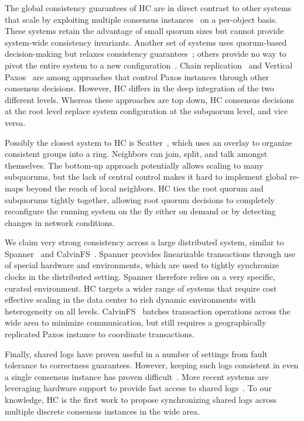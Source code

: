 The global consistency guarantees of HC are in direct contrast to other systems that scale by exploiting multiple consensus instances~\cite{bigtable,mdcc,megastore} on a per-object basis.
These systems retain the advantage of small quorum sizes but cannot provide system-wide consistency invariants.
Another set of systems uses quorum-based decision-making but relaxes consistency guarantees~\cite{dynamo,pnuts,cops}; others provide no way to pivot the entire system to a new configuration~\cite{scatter}.
Chain replication~\cite{van2004chain} and Vertical Paxos~\cite{vertical_paxos} are among approaches that control Paxos instances through other consensus decisions.
However, HC differs in the deep integration of the two different levels.
Whereas these approaches are top down, HC consensus decisions at the root level replace system configuration at the subquorum level, and vice versa.

Possibly the closest system to HC is Scatter~\cite{scatter}, which uses an overlay to organize consistent groups into a ring.
Neighbors can join, split, and talk amongst themselves. The bottom-up approach potentially allows scaling to many subquorums, but the lack of central control makes it hard to implement global re-maps beyond the reach of local neighbors.
HC ties the root quorum and subquorums tightly together, allowing root quorum decisions to completely reconfigure the running system on the fly either on demand or by detecting changes in network conditions.

We claim very strong consistency across a large distributed system, similar to Spanner~\cite{spanner} and CalvinFS~\cite{calvindb,calvinfs}.
Spanner provides linearizable  transactions through use of special hardware and environments, which are used to tightly synchronize clocks in the distributed setting.
Spanner therefore relies on a very specific, curated environment.
HC targets a wider range of systems that require cost effective scaling in the data center to rich dynamic environments with heterogeneity on all levels.
CalvinFS~\cite{calvindb,calvinfs} batches transaction operations across the wide area to minimize communication, but still requires a geographically replicated Paxos instance to coordinate transactions.

Finally, shared logs have proven useful in a number of settings from fault tolerance to correctness guarantees.
However, keeping such logs consistent in even a single consensus instance has proven difficult~\cite{chubby,gfs,zookeeper}.
More recent systems are leveraging hardware support to provide fast access to shared logs~\cite{vcorfu,tango,hyder-a,fawn}.
To our knowledge, HC is the first work to propose synchronizing shared logs across multiple discrete consensus instances in the wide area.

